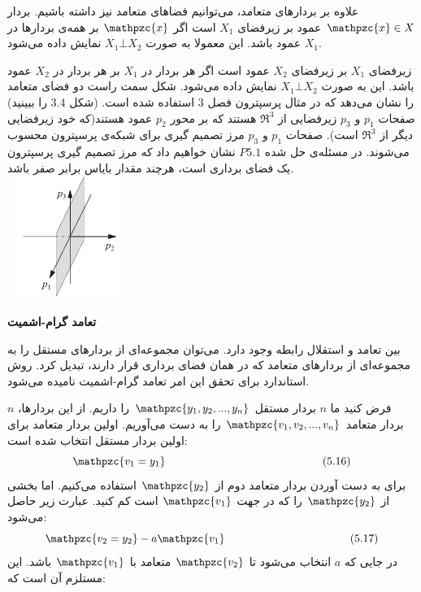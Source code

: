 \documentclass[a4paper,12pt]{report}
\begin{document}
	 علاوه بر بردارهای متعامد، می‌توانیم فضاهای متعامد نیز داشته باشیم. بردار $ \mathpzc{x} \in X $ عمود بر زیرفضای $ X_1 $ است اگر $ \mathpzc{x} $ بر همه‌ی بردارها در $ X_1 $ عمود باشد. این معمولا به صورت $ X_1 \bot X_2 $ نمایش داده می‌شود.
	 
	 
	  زیرفضای $ X_1 $  بر زیرفضای $ X_2 $ عمود است اگر هر بردار در $ X_1 $ بر هر بردار در $ X_2 $ عمود باشد. این به صورت $ X_1 \bot X_2 $ نمایش داده می‌شود. شکل سمت راست دو فضای متعامد را نشان می‌دهد که در مثال پرسپترون فصل 3 استفاده شده است. (شکل 3.4 را ببینید) صفحات $ p_1 $ و $ p_3 $ زیرفضایی از $ \Re^3 $ هستند که بر محور $ p_2 $ عمود هستند(که خود زیرفضایی دیگر از $ \Re^3 $ است). صفحات $ p_1 $ و $ p_3 $ مرز تصمیم گیری برای شبکه‌ی پرسپترون محسوب می‌شوند. در مسئله‌ی حل شده $ P5.1 $ نشان خواهیم داد که مرز تصمیم گیری پرسپترون یک فضای برداری است، هرچند مقدار بایاس برابر صفر باشد.\\
	   
	 \marginpar
	 {
	 	\includegraphics[width=4cm, height=4cm]{129}	
	 } 
	 
	 
	 \noindent\textbf{\Large تعامد گرام-اشمیت}
	 
	 بین تعامد و استقلال رابطه وجود دارد. می‌توان مجموعه‌ای از بردارهای مستقل را به مجموعه‌ای از بردارهای متعامد که در همان فضای برداری قرار دارند، تبدیل کرد. روش استاندارد برای تحقق این امر تعامد گرام-اشمیت نامیده می‌شود. 
	 
	 فرض کنید ما $ n $ بردار مستقل 
	 $ \mathpzc{y_1,y_2,...,y_n} $
	  را داریم. از این بردارها، $ n $ بردار متعامد 
	 $ \mathpzc{v_1,v_2,...,v_n} $
	  را به دست می‌آوریم. اولین بردار متعامد برای اولین بردار مستقل انتخاب شده است:
	 $$
	 \mathpzc{v_1=y_1} \hspace{5cm} (5.16)
	 $$
	 برای به دست آوردن بردار متعامد دوم از $ \mathpzc{y_2} $ استفاده می‌کنیم. اما بخشی از $ \mathpzc{y_2} $ را که در جهت $ \mathpzc{v_1} $ است کم کنید. عبارت زیر حاصل می‌شود:
	 $$
	 \mathpzc{v_2=y_2}-a\mathpzc{v_1} \hspace{4cm} (5.17)
	 $$
	 در جایی که $ a $ انتخاب می‌شود تا $ \mathpzc{v_2} $ متعامد با $ \mathpzc{v_1} $ باشد. این مستلزم آن است که:\\
	 
\end{document}
